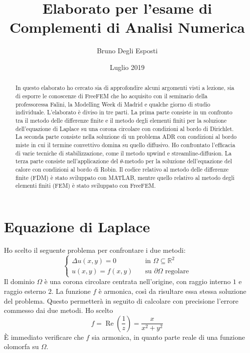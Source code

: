 \documentclass[a4paper]{article}
\title{\huge{Elaborato per l'esame di \\
Complementi di Analisi Numerica}}
\author{\Large{Bruno Degli Esposti}}
\date{Luglio 2019}
\begin{document}
\maketitle

\begin{abstract}
In questo elaborato ho cercato sia di approfondire alcuni argomenti
visti a lezione, sia di esporre le conoscenze di FreeFEM che ho acquisito
con il seminario della professoressa Falini,
la Modelling Week di Madrid e qualche giorno di studio individuale.
L'elaborato è diviso in tre parti.
La prima parte consiste in un confronto tra il metodo delle differenze finite
e il metodo degli elementi finiti per la soluzione dell'equazione di
Laplace su una corona circolare con condizioni al bordo di Dirichlet.
La seconda parte consiste nella soluzione di un problema ADR con condizioni
al bordo miste in cui il termine convettivo domina su quello diffusivo.
Ho confrontato l'efficacia di varie tecniche di stabilizzazione,
come il metodo upwind e streamline-diffusion.
La terza parte consiste nell'applicazione del $\theta$-metodo per la soluzione
dell'equazione del calore con condizioni al bordo di Robin.
Il codice relativo al metodo delle differenze finite (FDM) è stato sviluppato
con MATLAB, mentre quello relativo al metodo degli elementi finiti (FEM)
è stato sviluppato con FreeFEM.
\end{abstract}

\tableofcontents

\section{Equazione di Laplace}
Ho scelto il seguente problema per confrontare i due metodi:
\begin{equation} \label{eqn:laplace-cartesiano}
\begin{cases}
\Delta u(x,y) = 0 \quad & \text{in $\Omega \subseteq \mathbb{R}^2$} \\
u(x,y) = f(x,y)   \quad & \text{su $\partial \Omega$ regolare}
\end{cases}
\end{equation}
Il dominio $\Omega$ è una corona circolare centrata
nell'origine, con raggio interno $1$ e raggio esterno $2$.
La funzione $f$ è armonica, così da risultare essa stessa soluzione del problema.
Questo permetterà in seguito di calcolare con precisione l'errore
commesso dai due metodi. Ho scelto
\[
f = \operatorname{Re}\left(\frac{1}{z}\right) = \frac{x}{x^2+y^2}
\]
È immediato verificare che $f$ sia armonica, in quanto parte reale di
una funzione olomorfa su $\Omega$.
\end{document}

